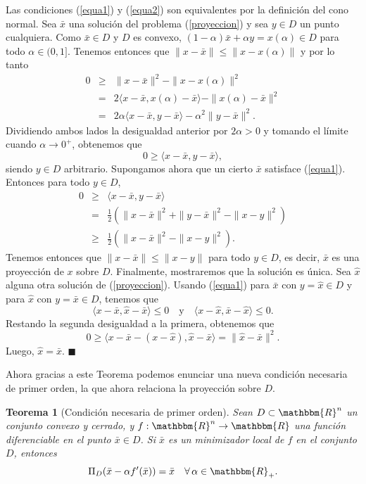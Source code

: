\documentclass[a4paper,12pt]{report}
\newcommand{\la}{\langle}
\newcommand{\ra}{\rangle}
\newcommand{\RR}{\mathbbm{R}}
\newcommand{\Rn}{\RR^n}
\newcommand{\bx}{\bar{x}}
\newcommand{\arr}{\rightarrow}
\newtheorem{teo}{Teorema}[section]
\newenvironment{dem}{\vspace*{-0.1cm}{\it Demostraci\'on:}}{\hfill
$\blacksquare$\\}
\begin{document}
\begin{dem}
Las condiciones (\ref{equa1}) y (\ref{equa2}) son equivalentes por la definici\'on del cono normal.
Sea $\bx$ una soluci\'on del problema (\ref{proyeccion}) y sea $y\in D$ un punto cualquiera. Como $\bx\in D$ y $D$ es convexo, $(1-\alpha)\bx+\alpha y=x(\alpha)\in D$ para todo $\alpha\in(0,1]$. Tenemos entonces que $\|x-\bx\|\leq\|x-x(\alpha)\|$ y por lo tanto
\begin{eqnarray*}
0&\geq&\|x-\bx\|^2-\|x-x(\alpha)\|^2\\
&=&2\la x-\bx,x(\alpha)-\bx\ra-\|x(\alpha)-\bx\|^2\\
&=&2\alpha\la x-\bx,y-\bx\ra-\alpha^2\|y-\bx\|^2.
\end{eqnarray*}
Dividiendo ambos lados la desigualdad anterior por $2\alpha>0$ y tomando el l\'imite cuando $\alpha\arr 0^+$, obtenemos que
$$0\geq\la x-\bx,y-\bx\ra,$$
siendo $y\in D$ arbitrario.
Supongamos ahora que un cierto $\bx$ satisface (\ref{equa1}). Entonces para todo $y\in D$,
\begin{eqnarray*}
0&\geq&\la x-\bx,y-\bx\ra\\
&=&\frac{1}{2}\left(\|x-\bx\|^2+\|y-\bx\|^2-\|x-y\|^2\right)\\
&\geq&\frac{1}{2}\left(\|x-\bx\|^2-\|x-y\|^2\right).
\end{eqnarray*}
Tenemos entonces que $\|x-\bx\|\leq\|x-y\|$ para todo $y\in D$, es decir, $\bx$ es una proyecci\'on de $x$ sobre $D$.
Finalmente, mostraremos que la soluci\'on es \'unica. Sea $\hat{x}$ alguna otra soluci\'on de (\ref{proyeccion}). Usando (\ref{equa1}) para $\bx$ con $y=\hat{x}\in D$ y para $\hat{x}$ con $y=\bx\in D$, tenemos que
$$\la x-\bx,\hat{x}-\bx\ra\leq 0\quad\mbox{y}\quad\la x-\hat{x},\bx-\hat{x}\ra\leq 0.$$
Restando la segunda desigualdad a la primera, obtenemos que
$$0\geq\la x-\bx-(x-\hat{x}),\hat{x}-\bx\ra=\|\hat{x}-\bx\|^2.$$
Luego, $\hat{x}=\bx$.
\end{dem}

Ahora gracias a este Teorema podemos enunciar una nueva condici\'on necesaria de primer orden, la que ahora relaciona la proyecci\'on sobre $D$.


\begin{teo}[Condici\'on necesaria de primer orden]
Sean $D\subset\Rn$ un conjunto convexo y cerrado, y $f:\Rn\arr\RR$ una funci\'on diferenciable en el punto $\bx\in D$.
Si $\bx$ es un minimizador local de $f$ en el conjunto $D$, entonces
\begin{equation}\label{equa3}
\Pi_{D}(\bx-\alpha f'(\bx))=\bx\quad\forall\,\alpha\in\RR_+.
\end{equation}
\end{teo}
\end{document}
